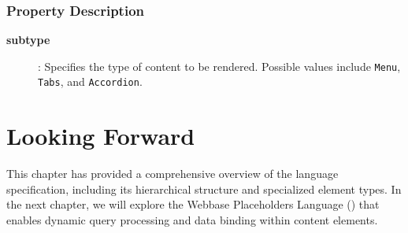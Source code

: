\subsubsection{Property Description}

\begin{description}
\item[\textbf{subtype}]: Specifies the type of content to be rendered. Possible values include \texttt{Menu}, \texttt{Tabs}, and \texttt{Accordion}.
\end{description}

\section{Looking Forward}
\label{sec:wbdl-forward}

This chapter has provided a comprehensive overview of the \wbdl{} language specification, including its hierarchical structure and specialized element types. In the next chapter, we will explore the Webbase Placeholders Language (\wbpl{}) that enables dynamic query processing and data binding within \wbdl{} content elements.

